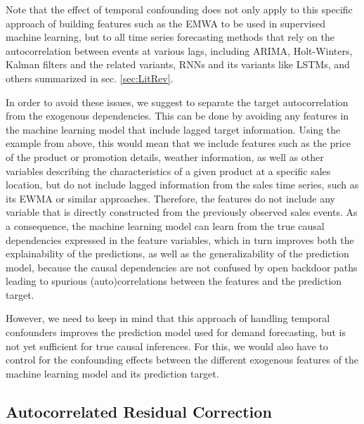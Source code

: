 \documentclass[BCOR=1mm, DIV=calc,10pt,
twoside=true,
twocolumn,
headings=normal]{scrartcl}
\begin{document}
Note that the effect of temporal confounding does not only apply to this specific approach of building features such as the EMWA to be used in supervised machine learning, but to all time series forecasting methods that rely on the autocorrelation between events at various lags, including ARIMA, Holt-Winters, Kalman filters and the related variants, RNNs and its variants like LSTMs, and others summarized in sec. \ref{sec:LitRev}.

In order to avoid these issues, we suggest to separate the target autocorrelation from the exogenous dependencies. This can be done by avoiding any features in the machine learning model that include lagged target information. Using the example from above, this would mean that we include features such as the price of the product or promotion details, weather information, as well as other variables describing the characteristics of a given product at a specific sales location, but do not include lagged information from the sales time series, such as its EWMA or similar approaches. Therefore, the features do not include any variable that is directly constructed from the previously observed sales events. As a consequence, the machine learning model can learn from the true causal dependencies expressed in the feature variables, which in turn improves both the explainability of the predictions, as well as the generalizability of the prediction model, because the causal dependencies are not confused by open backdoor paths leading to spurious (auto)correlations between the features and the prediction target.

However, we need to keep in mind that this approach of handling temporal confounders improves the prediction model used for demand forecasting, but is not yet sufficient for true causal inferences. For this, we would also have to control for the confounding effects between the different exogenous features of the machine learning model and its prediction target.

\subsection{Autocorrelated Residual Correction}
\end{document}
